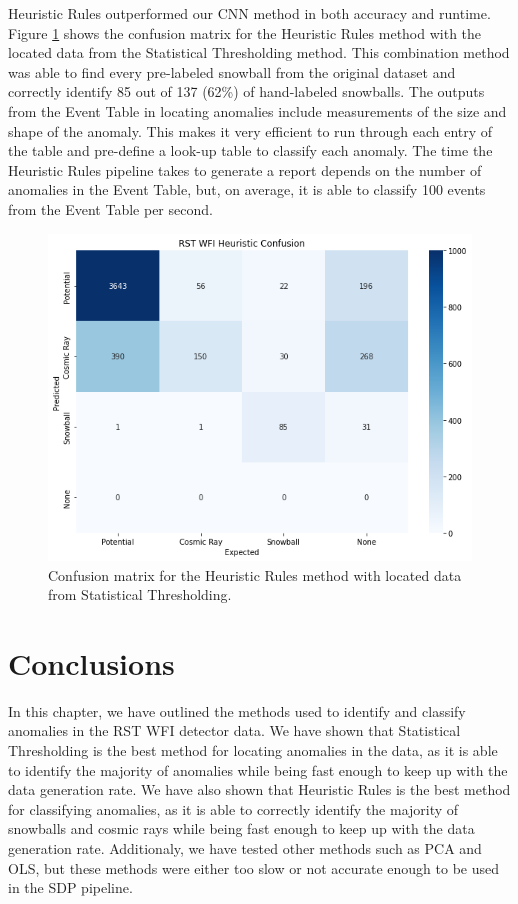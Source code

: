 Heuristic Rules outperformed our CNN method in both accuracy and runtime.
Figure \ref{rst/fig:heuristic_confusion} shows the confusion matrix for the Heuristic Rules method with the located data from the Statistical Thresholding method.
This combination method was able to find every pre-labeled snowball from the original dataset and correctly identify 85 out of 137 (62\%) of hand-labeled snowballs. 
The outputs from the Event Table in locating anomalies include measurements of the size and shape of the anomaly. 
This makes it very efficient to run through each entry of the table and pre-define a look-up table to classify each anomaly. 
The time the Heuristic Rules pipeline takes to generate a report depends on the number of anomalies in the Event Table, but, on average, it is able to classify 100 events from the Event Table per second. 

\begin{figure}
    \centering
    \includegraphics[width=.7\textwidth]{figs/rst/heuristic_confusion.png}
    \caption[Confusion Matrix for Heuristic Rules with Statistical Thresholding]{Confusion matrix for the Heuristic Rules method with located data from Statistical Thresholding.}
    \label{rst/fig:heuristic_confusion}
\end{figure}

\section{Conclusions}
\label{rst/sec:conclusions}
In this chapter, we have outlined the methods used to identify and classify anomalies in the RST WFI detector data.
We have shown that Statistical Thresholding is the best method for locating anomalies in the data, as it is able to identify the majority of anomalies while being fast enough to keep up with the data generation rate.
We have also shown that Heuristic Rules is the best method for classifying anomalies, as it is able to correctly identify the majority of snowballs and cosmic rays while being fast enough to keep up with the data generation rate.
Additionaly, we have tested other methods such as PCA and OLS, but these methods were either too slow or not accurate enough to be used in the SDP pipeline.


